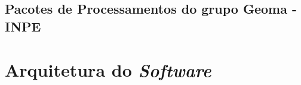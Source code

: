             
        \subsection{Pacotes de Processamentos do grupo Geoma - INPE}
    
    
    
    \section{Arquitetura do \textit{Software}}
    
        
    
